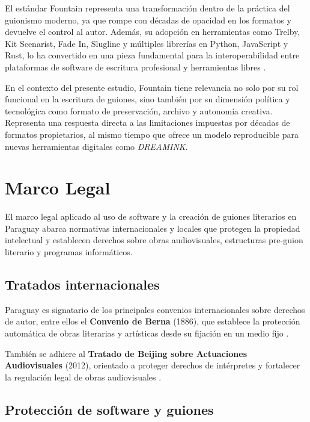 \documentclass[12pt]{article}
\begin{document}
	El estándar Fountain representa una transformación dentro de la práctica del guionismo moderno, ya que rompe con décadas de opacidad en los formatos y devuelve el control al autor. Además, su adopción en herramientas como Trelby, Kit Scenarist, Fade In, Slugline y múltiples librerías en Python, JavaScript y Rust, lo ha convertido en una pieza fundamental para la interoperabilidad entre plataformas de software de escritura profesional y herramientas libres \parencite{fountain_github, nofilmschool_fountain}.

	En el contexto del presente estudio, Fountain tiene relevancia no solo por su rol funcional en la escritura de guiones, sino también por su dimensión política y tecnológica como formato de preservación, archivo y autonomía creativa. Representa una respuesta directa a las limitaciones impuestas por décadas de formatos propietarios, al mismo tiempo que ofrece un modelo reproducible para nuevas herramientas digitales como \textit{DREAMINK}.

	\section{Marco Legal}

	El marco legal aplicado al uso de software y la creación de guiones literarios en Paraguay abarca normativas internacionales y locales que protegen la propiedad intelectual y establecen derechos sobre obras audiovisuales, estructuras pre-guion literario y programas informáticos.

	\subsection{Tratados internacionales}

	Paraguay es signatario de los principales convenios internacionales sobre derechos de autor, entre ellos el \textbf{Convenio de Berna} (1886), que establece la protección automática de obras literarias y artísticas desde su fijación en un medio fijo \parencite{berne2025,rule_shorter_term}.

	También se adhiere al \textbf{Tratado de Beijing sobre Actuaciones Audiovisuales} (2012), orientado a proteger derechos de intérpretes y fortalecer la regulación legal de obras audiovisuales \parencite{beijing_treaty2025}.

	\subsection{Protección de software y guiones}
\end{document}
